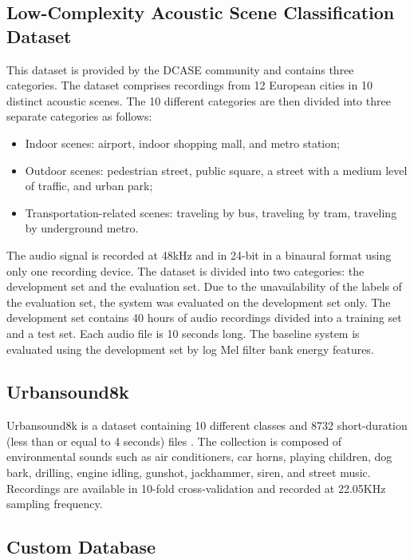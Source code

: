 \subsection{Low-Complexity Acoustic Scene Classification Dataset } %

This dataset is provided by the DCASE community \cite{Mesaros2018_DCASE} and contains three categories. The dataset comprises  recordings from 12 European cities in 10 distinct acoustic scenes. The 10 different categories are then divided into three separate categories as follows: 
\begin{itemize}[label=$\cdot$]
\item {Indoor scenes: airport, indoor shopping mall, and metro station;}
\item {Outdoor scenes: pedestrian street, public square, a street with a medium level of traffic, and urban park;}
\item {Transportation-related scenes: traveling by bus, traveling by tram, traveling by underground metro.}
\end{itemize}

The audio signal is recorded at 48kHz and in 24-bit in a binaural format using only one recording device. The dataset is divided into two categories: the development set and the evaluation set. Due to the unavailability of the labels of the evaluation set, the system was evaluated  on the development set only. The development set contains 40 hours of audio recordings divided into a training set and a test set. Each audio file is 10 seconds long. The baseline system \cite{kumari2019edgel} is evaluated using the development set by log Mel filter bank energy features. 


\subsection{Urbansound8k}

Urbansound8k is a dataset containing 10 different classes and 8732 short-duration (less than or equal to 4 seconds) files \cite{salamon2015unsupervised, piczak2015environmental}. The collection is composed of environmental sounds such as air conditioners, car horns, playing children, dog bark, drilling, engine idling, gunshot, jackhammer, siren, and street music. Recordings are available in 10-fold cross-validation and recorded at 22.05KHz sampling frequency. 

\subsection{Custom Database}

